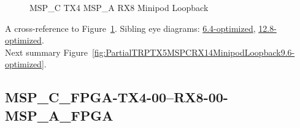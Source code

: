 \begin{figure}[h]
\begin{subfigure}{0.33\textwidth}
\hyperref[sec:MSPCFPGATX406RX806MSPAFPGA9.6-optimized]{}
\end{subfigure}\hspace*{\fill}
\begin{subfigure}{0.33\textwidth}
\hyperref[sec:MSPCFPGATX407RX807MSPAFPGA9.6-optimized]{}
\end{subfigure}\hspace*{\fill}
\begin{subfigure}{0.33\textwidth}
\hyperref[sec:MSPCFPGATX408RX808MSPAFPGA9.6-optimized]{}
\end{subfigure}

\begin{subfigure}{0.33\textwidth}
\hyperref[sec:MSPCFPGATX409RX809MSPAFPGA9.6-optimized]{}
\end{subfigure}\hspace*{\fill}
\begin{subfigure}{0.33\textwidth}
\hyperref[sec:MSPCFPGATX410RX810MSPAFPGA9.6-optimized]{}
\end{subfigure}\hspace*{\fill}
\begin{subfigure}{0.33\textwidth}
\hyperref[sec:MSPCFPGATX411RX811MSPAFPGA9.6-optimized]{}
\end{subfigure}

\caption{MSP\_C TX4 MSP\_A RX8 Minipod Loopback} \label{fig:MSPCTX4MSPARX8MinipodLoopback9.6-optimized}
\end{figure}

A cross-reference to Figure~\ref{fig:MSPCTX4MSPARX8MinipodLoopback9.6-optimized}.
Sibling eye diagrams: \hyperref[sec:MSPCTX4MSPARX8MinipodLoopback6.4-optimized]{6.4-optimized}, \hyperref[sec:MSPCTX4MSPARX8MinipodLoopback12.8-optimized]{12.8-optimized}. \\
Next summary Figure~\ref{fig:PartialTRPTX5MSPCRX14MinipodLoopback9.6-optimized}.
\clearpage
% 
\subsection{MSP\_C\_FPGA-TX4-00--RX8-00-MSP\_A\_FPGA}\label{sec:MSPCFPGATX400RX800MSPAFPGA9.6-optimized}

